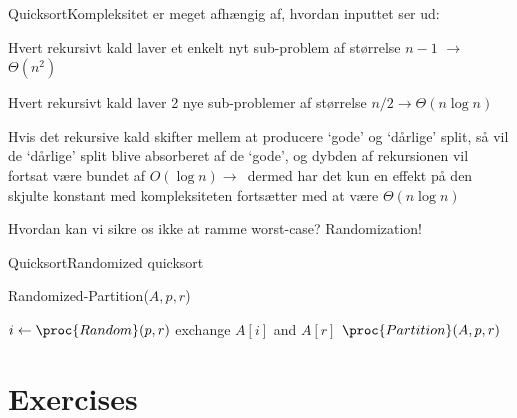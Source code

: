 \documentclass[aspectratio=1610]{beamer}
\begin{document}
\begin{frame}{Quicksort}{Kompleksitet}
     er \alert{meget afhængig} af, hvordan inputtet ser ud:

    \begin{description}
        \pause
        \item[Worst case] Hvert rekursivt kald laver et enkelt nyt sub-problem
            af størrelse $n - 1$ $\to$ $\Theta(n^2)$
        \pause
        \item[Best case] Hvert rekursivt kald laver 2 nye sub-problemer af
            størrelse $n/2 \to \Theta(n \log n)$
        \pause
        \item[Average case] Hvis det rekursive kald skifter mellem at producere
            `gode' og `dårlige' split, så vil de `dårlige' split blive
            absorberet af de `gode', og dybden af rekursionen vil fortsat være
            bundet af $O(\log n) \to \,$ dermed har det kun en effekt på den
            skjulte konstant med kompleksiteten fortsætter med at være $\Theta(n
            \log n)$
    \end{description}

    \pause
    Hvordan kan vi sikre os ikke at ramme worst-case? \pause
    \alert{Randomization!}
\end{frame}

\begin{frame}{Quicksort}{Randomized quicksort}
    \centering
    \begin{minipage}{.6\textwidth}
        \begin{block}{Randomized-Partition($A,p,r$)}

            \vspace{-\abovedisplayskip}
            \begin{codebox}
                \li $i \gets \proc{Random}(p, r)$
                \li exchange $A[i]$ and $A[r]$
                \li \Return $\proc{Partition}(A,p,r)$
            \end{codebox}
        \end{block}
    \end{minipage}
\end{frame}


\section{Exercises}
\end{document}
